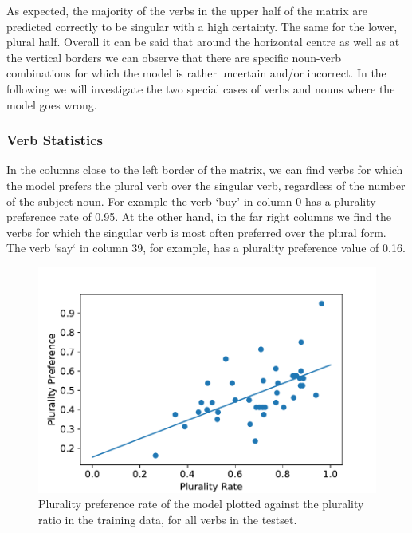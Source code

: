 As expected, the majority of the verbs in the upper half of the matrix are predicted correctly to be singular with a high certainty. The same for the lower, plural half. Overall it can be said that around the horizontal centre 
as well as at the vertical borders we can observe that there are specific 
noun-verb combinations for which the model is rather uncertain and/or incorrect. 
In the following we will investigate the two special cases of verbs and nouns where the model goes wrong.

\subsubsection{Verb Statistics}

In the columns close to the left border of the matrix, we can find verbs for which the model prefers the plural verb over the singular verb, regardless of the number of the subject noun. For example the verb `buy' in column 0 has a plurality preference rate of 0.95. At the other hand, in the far right columns we find the verbs for which the singular verb is most often preferred over the plural form. The verb `say` in column 39, for example, has a plurality preference value of 0.16.

     \begin{figure}
     \centering
        \includegraphics[scale=0.5]{lin_reg.pdf}
        \caption{Plurality preference rate of the model 
        plotted against the plurality ratio in the training 
        data, for all verbs in the testset.}
        \label{fig:lin_reg}
    \end{figure}

